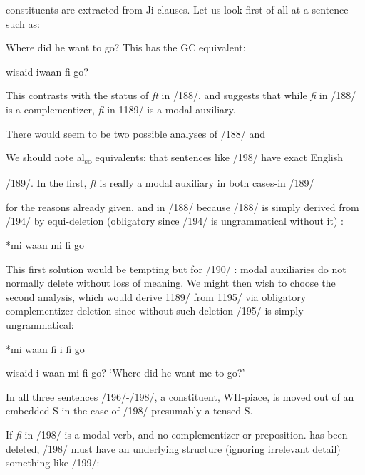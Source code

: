 constituents are extracted from Ji-clauses. Let us look first of all at
a sentence such as:

\ea\label{ex:2:196}
 Where did he want to go? This has the GC equivalent:
\z

\ea\label{ex:2:197}
 wisaid iwaan fi go?
\z

This contrasts with the status of \textit{ft} in /188/, and suggests that while
\textit{fi} in /188/ is a complementizer, \textit{fi} in 1189/ is a modal auxiliary.

There would seem to be two possible analyses of /188/ and

We should note al\textsubscript{so} equivalents:
that
sentences
like /198/ have exact English

/189/. In the first, \textit{ft} is really a modal auxiliary in both cases-in /189/

for the reasons already given, and in /188/ because /188/ is simply derived from /194/ by equi{}-deletion (obligatory since /194/ is ungrammatical without it) :

\ea\label{ex:2:194}
 *mi waan mi fi go
\z

This first solution would be tempting but for /190/ : modal auxiliaries do not normally delete without loss of meaning. We might then wish to choose the second analysis, which would derive 1189/ from 1195/ via obligatory complementizer deletion since without such deletion /195/ is simply ungrammatical:

\ea\label{ex:2:195}
 *mi waan fi i fi go
\z

\ea\label{ex:2:198}
 wisaid i waan mi fi go?
\glt `Where did he want me to go?'
\z



In all three sentences /196/-/198/, a constituent, WH-piace, is moved out of an embedded S-in the case of /198/ presumably a tensed S.

If \textit{fi} in /198/ is a modal verb, and no complementizer or preposition. has been deleted, /198/ must have an underlying structure (ignoring irrelevant detail) something like /199/:


